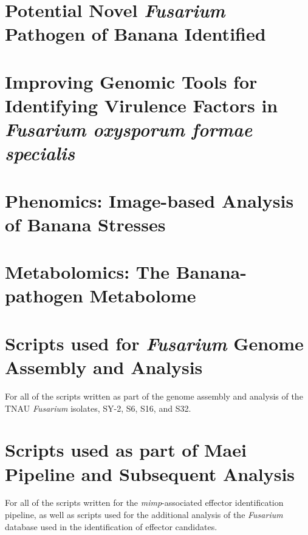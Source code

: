 \documentclass[11pt,a4paper]{report}
\begin{document}
\chapter{Potential Novel \textit{Fusarium} Pathogen of Banana Identified }
    
    
\chapter{Improving Genomic Tools for Identifying Virulence Factors in   \textit{Fusarium oxysporum formae specialis}}
    
    
\chapter{Phenomics: Image-based Analysis of Banana Stresses}
    
    
 \chapter{Metabolomics: The Banana-pathogen Metabolome}
    


\appendix                            %
\chapter{Scripts used for \textit{Fusarium} Genome Assembly and Analysis}
For all of the scripts written as part of the genome assembly and analysis of the TNAU \textit{Fusarium} isolates, SY-2, S6, S16, and S32. 


\chapter{Scripts used as part of Maei Pipeline and Subsequent Analysis}
For all of the scripts written for the \textit{mimp}-associated effector identification pipeline, as well as scripts used for the additional analysis of the \textit{Fusarium} database used in the identification of effector candidates. 


%


\end{document}
